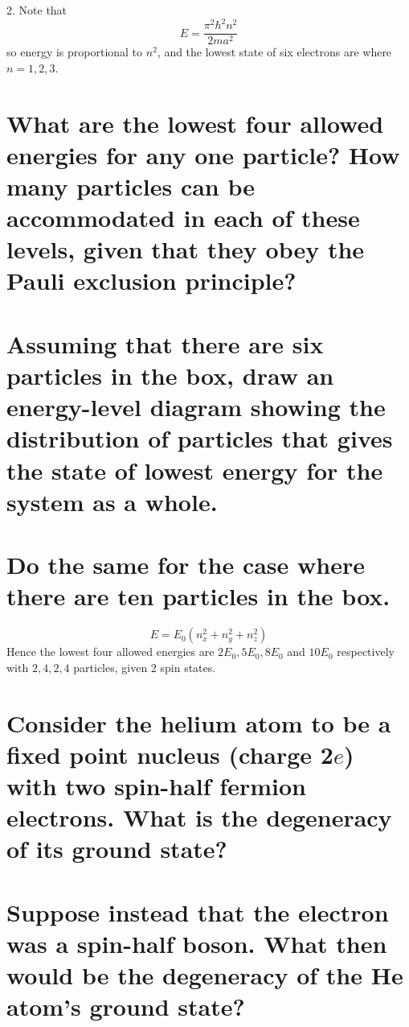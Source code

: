 \documentclass[answers]{exam}
\begin{document}
\begin{questions}
\begin{solution}
	2. Note that
	$$E = \frac{\pi^2\hbar^2n^2}{2ma^2}$$
	so energy is proportional to $n^2$, and the lowest state of six electrons are where $n=1,2,3$.
\end{solution}


\begin{parts}
	\part{What are the lowest four allowed energies for any one particle? How many particles can be accommodated in each of these levels, given that they obey the Pauli exclusion principle?}
	\part{Assuming that there are six particles in the box, draw an energy-level diagram showing the distribution of particles that gives the state of lowest energy for the system as a whole.}
	\part{Do the same for the case where there are ten particles in the box.}
\end{parts}

\begin{solution}
	$$E = E_0(n_x^2 + n_y^2 + n_z^2)$$
	Hence the lowest four allowed energies are $2E_0, 5E_0, 8E_0$ and $10E_0$ respectively with $2, 4, 2, 4$ particles, given 2 spin states.
\end{solution}

\question{}

\begin{parts}
	\part{Consider the helium atom to be a fixed point nucleus (charge 2$e$) with two spin-half fermion electrons. What is the degeneracy of its ground state?}
	\part{Suppose instead that the electron was a spin-half boson. What then would be the degeneracy of the He atom's ground state?}

\end{parts}
\end{questions}
\end{document}
